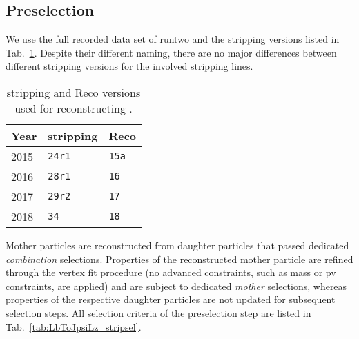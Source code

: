 \subsection{Preselection}
\label{sec:LbToJpsiLz_presel}
We use the full recorded data set of \gls{runtwo} and the \gls{stripping} versions listed in Tab.~\ref{tab:LbToJpsiLz_vstripping}.
Despite their different naming, there are no major differences between different \gls{stripping} versions for the involved \gls{stripping} lines.
\begin{table}[htbp]
    \centering
    \caption{\Gls{stripping} and Reco versions used for reconstructing \decay{\Lb}{\jpsi\Lz}.}
    \label{tab:LbToJpsiLz_vstripping}

    \begin{tabular}{lll}
        \toprule
        Year & \Gls{stripping} & Reco \\
        \midrule
        2015 & \texttt{24r1} & \texttt{15a} \\
        2016 & \texttt{28r1} & \texttt{16} \\
        2017 & \texttt{29r2} & \texttt{17} \\
        2018 & \texttt{34} & \texttt{18} \\
        \bottomrule
    \end{tabular}
\end{table}
Mother particles are reconstructed from daughter particles that passed dedicated \textit{combination} selections.
Properties of the reconstructed mother particle are refined through the vertex fit procedure (no advanced constraints, such as mass or \gls{pv} constraints, are applied) and are subject to dedicated \textit{mother} selections, whereas properties of the respective daughter particles are not updated for subsequent selection steps.
All selection criteria of the preselection step are listed in Tab.~\ref{tab:LbToJpsiLz_stripsel}.

